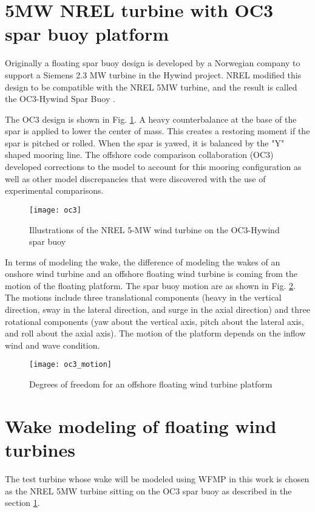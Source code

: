 \documentclass{umthesis}
\begin{document}
\section{5MW NREL turbine with OC3 spar buoy platform}\label{sec:spar}
Originally a floating spar buoy design is developed by a Norwegian company to support a Siemens 2.3 MW turbine in the Hywind project. NREL modified this design to be compatible with the NREL 5MW turbine, and the result is called the OC3-Hywind Spar Buoy \cite{oc3}.

The OC3 design is shown in Fig. \ref{fig:oc3}. A heavy counterbalance at the base of the spar is applied to lower the center of mass. This creates a restoring moment if the spar is pitched or rolled. When the spar is yawed, it is balanced by the "Y" shaped mooring line. The offshore code comparison collaboration (OC3) developed corrections to the model to account for this mooring configuration as well as other model discrepancies that were discovered with the use of experimental comparisons.   

\begin{figure}
  \centering
  \texttt{[image: oc3]}
  \caption{Illustrations of the NREL 5-MW wind turbine on the OC3-Hywind spar buoy \cite{oc3}}\label{fig:oc3}
\end{figure}

In terms of modeling the wake, the difference of modeling the wakes of an onshore wind turbine and an offshore floating wind turbine is coming from the motion of the floating platform. The spar buoy motion are as shown in Fig. \ref{fig:oc3_motion}. The motions include three translational components (heavy in the vertical direction, sway in the lateral direction, and surge in the axial direction) and three rotational components (yaw about the vertical axis, pitch about the lateral axis, and roll about the axial axis). The motion of the platform depends on the inflow wind and wave condition.

\begin{figure}
  \centering
  \texttt{[image: oc3\_motion]}
  \caption{Degrees of freedom for an offshore floating wind turbine platform \cite{Tran}}\label{fig:oc3_motion}
\end{figure}


\section{Wake modeling of floating wind turbines}
The test turbine whose wake will be modeled using WFMP in this work is chosen as the NREL 5MW turbine sitting on the OC3 spar buoy as described in the section \ref{sec:spar}.
\end{document}
